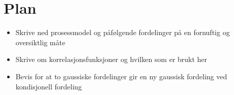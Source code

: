 \section{Plan}
\begin{itemize}
\item Skrive ned prosessmodel og påfølgende fordelinger på en fornuftig og oversiktlig måte
\item Skrive om korrelasjonsfunksjoner og hvilken som er brukt her 
\item Bevis for at to gaussiske fordelinger gir en ny gaussisk fordeling ved kondisjonell fordeling
\end{itemize}
\fi